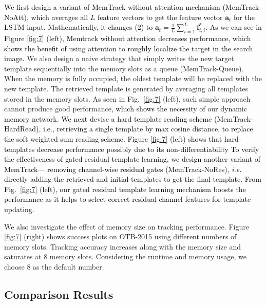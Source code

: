 \documentclass[runningheads]{llncs}
\newcommand{\yty}[1]{\textcolor{black}{#1}}
\newcommand{\abc}[1]{\textcolor{black}{#1}}
\newcommand{\abcn}[1]{\textcolor{black}{#1}}
\newcommand{\ty}[1]{\textcolor{black}{#1}}
\begin{document}
\yty{ We first design a variant of MemTrack without attention mechanism (MemTrack-NoAtt), which averages all $L$ feature vectors to get the %
	feature vector $\mathbf{a}_t$ \abcn{for the LSTM input.} 
	Mathematically, it changes %
	(2) to $\mathbf{a}_t = \frac{1}{L}\sum_{i=1}^{L}\mathbf{f}^*_{t,i} $. As we can see in Figure \ref{fig:7} (left), Memtrack without attention decreases performance, \abc{which shows the benefit of using attention to roughly localize the target in the search image.}} 
We also design a naive strategy that simply writes the new target template sequentially into the memory slots as a queue (MemTrack-Queue). When the memory is fully occupied, the oldest template will be replaced with the new  template. The retrieved template is generated by averaging all templates stored in the memory slots. As seen in Fig.~\ref{fig:7} (left), such simple approach cannot produce good performance, \abc{which shows the necessity of our dynamic memory network}. \ty{We next devise a hard template reading scheme (MemTrack-HardRead), i.e., retrieving a single template by max cosine distance, to replace the soft weighted sum reading scheme. Figure \ref{fig:7} (left) shows that hard-templates decrease performance possibly due to its non-differentiability }
\yty{To verify the effectiveness of \abc{gated} residual template learning, we design another variant of MemTrack--- removing channel-wise residual gates (MemTrack-NoRes), \emph{i.e.} directly adding the retrieved and initial templates to get the final template. From Fig.~\ref{fig:7} (left), our \abc{gated} residual template learning mechanism boosts the performance as it helps to select correct residual channel features for template updating.}

We also investigate the effect of memory size  on tracking performance. Figure \ref{fig:7} (right) shows success plots on OTB-2015 using different numbers of memory slots. Tracking accuracy increases along with the memory size and saturates at 8 memory slots. Considering the runtime and memory usage, we choose 8 as the default number. %

\subsection{Comparison Results}
\end{document}
